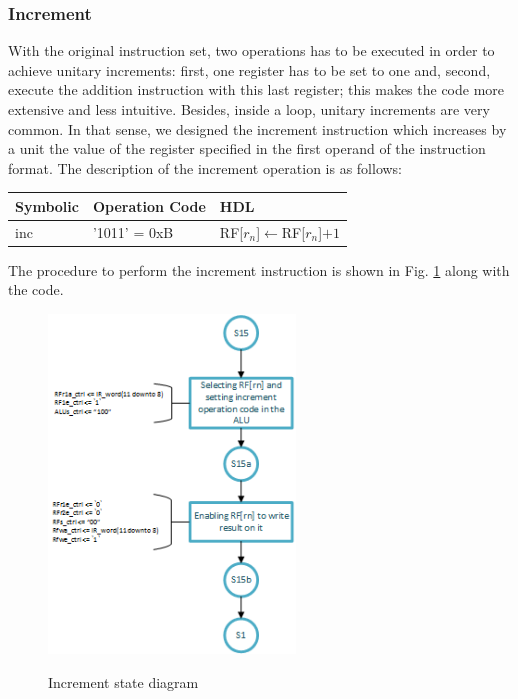 \documentclass[]{article}
\begin{document}
\subsubsection{Increment}

With the original instruction set, two operations has to be executed in order to achieve unitary increments: first, one register has to be set to one and, second, execute the addition instruction with this last register; this makes the code more extensive and less intuitive. Besides, inside a loop, unitary increments are very common. In that sense, we designed the increment instruction which increases by a unit the value of the register specified in the first operand of the instruction format. The description of the increment operation is as follows:
\begin{table}[h]
	\centering
	{
		\begin{tabular}{|p{3cm}|p{3cm}|p{3cm}|}
			\hline
			\textbf{Symbolic} & \textbf{Operation Code} & \textbf{HDL} \\
			\hline
			inc & '1011' = 0xB & RF[$r_n$]$\leftarrow$RF[$r_n$]$+1$\\
			\hline
		\end{tabular}
	}
\end{table}

The procedure to perform the increment instruction is shown in Fig. \ref{fig:4} along with the code.
\begin{figure}[H]
	\caption{Increment state diagram}
	\centering
	\includegraphics[height=9cm]{inc}
	\label{fig:4}
\end{figure}
\end{document}
